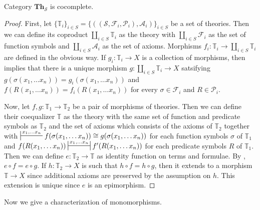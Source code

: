 \documentclass[reqno]{amsart}
\theoremstyle{definition}
\theoremstyle{remark}
\newcommand{\cat}[1]{\mathbf{#1}}
\newcommand{\Th}{\cat{Th}}
\numberwithin{figure}{section}
\begin{document}
\begin{prop}[th-cocomplete]
Category $\Th_\mathcal{S}$ is cocomplete.
\end{prop}
\begin{proof}
First, let $\{ \mathbb{T}_i \}_{i \in S} = \{ ((\mathcal{S},\mathcal{F}_i,\mathcal{P}_i),\mathcal{A}_i) \}_{i \in S}$ be a set of theories.
Then we can define its coproduct $\coprod\limits_{i \in S} \mathbb{T}_i$ as the theory with $\coprod\limits_{i \in S} \mathcal{F}_i$ as the set of function symbols and $\coprod\limits_{i \in S} \mathcal{A}_i$ as the set of axioms.
Morphisms $f_i : \mathbb{T}_i \to \coprod\limits_{i \in S} \mathbb{T}_i$ are defined in the obvious way.
If $g_i : \mathbb{T}_i \to X$ is a collection of morphisms, then  implies that there is a unique morphism $g : \coprod\limits_{i \in S} \mathbb{T}_i \to X$
    satsifying $g(\sigma(x_1, \ldots x_n)) = g_i(\sigma(x_1, \ldots x_n))$ and $f(R(x_1, \ldots x_n)) = f_i(R(x_1, \ldots x_n))$
    for every $\sigma \in \mathcal{F}_i$ and $R \in \mathcal{P}_i$.

Now, let $f,g : \mathbb{T}_1 \to \mathbb{T}_2$ be a pair of morphisms of theories.
Then we can define their coequalizer $\mathbb{T}$ as the theory with the same set of function and predicate symbols as $\mathbb{T}_2$ and the set of axioms which consists of the axioms of $\mathbb{T}_2$
together with $\sststile{}{x_1, \ldots x_n} f(\sigma(x_1, \ldots x_n)) \cong g(\sigma(x_1, \ldots x_n))$ for each function symbols $\sigma$ of $\mathbb{T}_1$
and $f(R(x_1, \ldots x_n)) \ssststile{}{x_1, \ldots x_n} f'(R(x_1, \ldots x_n))$ for each predicate symbols $R$ of $\mathbb{T}_1$.
Then we can define $e : \mathbb{T}_2 \to \mathbb{T}$ as identity function on terms and formulae.
By , $e \circ f = e \circ g$.
If $h : \mathbb{T}_2 \to X$ is such that $h \circ f = h \circ g$, then it extends to a morphism $\mathbb{T} \to X$ since additional axioms are preserved by the assumption on $h$.
This extension is unique since $e$ is an epimorphism.
\end{proof}

Now we give a characterization of monomorphisms.
\end{document}
